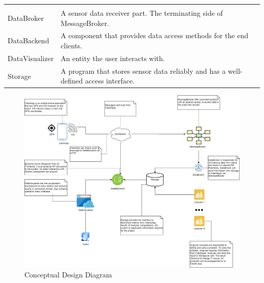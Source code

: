 \begin{longtable}[]{@{}ll@{}}
\begin{minipage}[t]{0.47\columnwidth}
\end{minipage}\tabularnewline
\begin{minipage}[t]{0.47\columnwidth}\raggedright
DataBroker\strut
\end{minipage} & \begin{minipage}[t]{0.47\columnwidth}\raggedright
A sensor data receiver part. The terminating side of
MessageBroker.\strut
\end{minipage}\tabularnewline
\begin{minipage}[t]{0.47\columnwidth}\raggedright
DataBackend\strut
\end{minipage} & \begin{minipage}[t]{0.47\columnwidth}\raggedright
A component that provides data access methods for the end clients.\strut
\end{minipage}\tabularnewline
\begin{minipage}[t]{0.47\columnwidth}\raggedright
DataVisualizer\strut
\end{minipage} & \begin{minipage}[t]{0.47\columnwidth}\raggedright
An entity the user interacts with.\strut
\end{minipage}\tabularnewline
\begin{minipage}[t]{0.47\columnwidth}\raggedright
Storage\strut
\end{minipage} & \begin{minipage}[t]{0.47\columnwidth}\raggedright
A program that stores sensor data reliably and has a well-defined access
interface.\strut
\end{minipage}\tabularnewline
\bottomrule
\end{longtable}

\begin{figure}[H]
\centering
\includegraphics[width=\linewidth]{schemes/conceptual/ConceptualDiagram.png}
\caption{Conceptual Design Diagram}
\end{figure}


